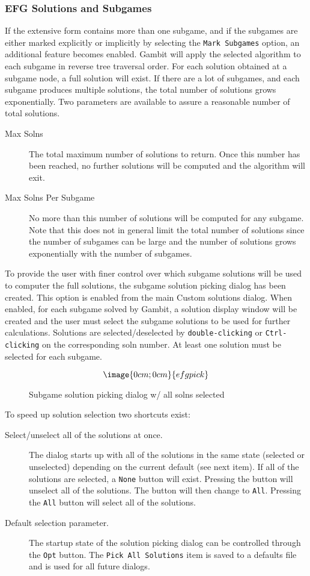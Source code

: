 \subsubsection{EFG Solutions and Subgames}\label{EFGSolnSubg}
If the extensive form contains more than one subgame, and if the subgames are
either marked explicitly or implicitly by selecting the {\tt Mark Subgames}
option, an additional feature becomes enabled.  Gambit will apply the 
selected algorithm to each subgame in reverse tree traversal order.  For each
solution obtained at a subgame node, a full solution will exist.  If there
are a lot of subgames, and each subgame produces multiple solutions, the 
total number of solutions grows exponentially.  Two parameters are available
to assure a reasonable number of total solutions.
\begin{description}
\item[Max Solns] The total maximum number of solutions to return.  Once this
number has been reached, no further solutions will be computed and the
algorithm will exit.
\item[Max Solns Per Subgame] No more than this number of solutions will be
computed for any subgame.  Note that this does not in general limit the
total number of solutions since the number of subgames can be large and the
number of solutions grows exponentially with the number of subgames.
\end{description}

To provide the user with finer control over which subgame solutions will be
used to computer the full solutions, the subgame solution picking dialog has
been created.  This option is enabled from the main Custom solutions dialog.
When enabled, for each subgame solved by Gambit, a solution display window
will be created and the user must select the subgame solutions to be used
for further calculations.  Solutions are selected/deselected by {\tt double-clicking} 
or {\tt Ctrl-clicking} on the corresponding soln number.  At least one solution
must be selected for each subgame.

\begin{figure}
$$\image{0cm;0cm}{efgpick}$$
\caption{Subgame solution picking dialog w/ all solns selected}\label{fig_efgpick}
\end{figure}

To speed up solution selection two shortcuts exist:

\begin{description}
\item[Select/unselect all of the solutions at once.]  The dialog starts up with
all of the solutions in the same state (selected or unselected) depending on
the current default (see next item).  If all of the solutions are selected,
a {\tt None} button will exist.  Pressing the button will unselect all of the
solutions.  The button will then change to {\tt All}.  Pressing the {\tt All} 
button will select all of the solutions.
\item[Default selection parameter.]  The startup state of the solution picking
dialog can be controlled through the {\tt Opt} button.  The {\tt Pick All Solutions} 
item is saved to a defaults file and is used for all future dialogs.
\end{description}

